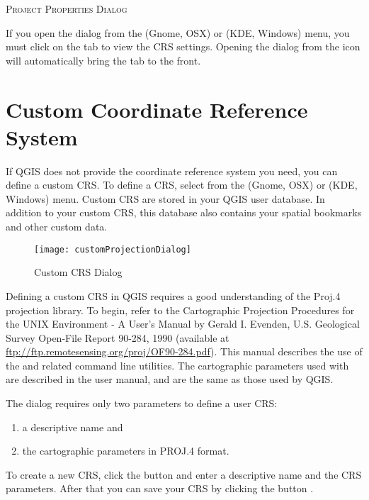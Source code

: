 \begin{Tip}
\caption{\textsc{Project Properties Dialog}}
If you open the  dialog from the
 (Gnome, OSX) or  
(KDE, Windows) menu, you must click on the  tab to view the CRS settings. Opening the dialog from the
 icon will automatically bring
the  tab to the front.
\end{Tip}

\section{Custom Coordinate Reference System}\label{sec:customprojections}

If QGIS does not provide the coordinate reference system you need, you
can define a custom CRS. To define a CRS, select
 from the  
(Gnome, OSX) or  (KDE, Windows) menu.
Custom CRS are stored in your QGIS user database. In addition to your custom
CRS, this database also contains your spatial bookmarks and other custom data. 

\begin{figure}[ht]
   \centering
   \caption{Custom CRS Dialog \nixcaption}\label{fig:customprojections}\smallskip
   \texttt{[image: customProjectionDialog]}
\end{figure}

Defining a custom CRS in QGIS requires a good understanding of the Proj.4
projection library. To begin, refer to the Cartographic Projection Procedures
for the UNIX Environment - A User's Manual by Gerald I. Evenden, U.S.
Geological Survey Open-File Report 90-284, 1990 (available at \url{ftp://ftp.remotesensing.org/proj/OF90-284.pdf}).
This manual describes the use of the  and related command line
utilities. The cartographic parameters used with  are
described in the user manual, and are the same as those used by QGIS. 

The  dialog requires
only two parameters to define a user CRS: 
\begin{enumerate}
\item a descriptive name and
\item the cartographic parameters in PROJ.4 format.
\end{enumerate}
To create a new CRS, click the  button and enter a
descriptive name and the CRS parameters. After that you can save your CRS by
clicking the button .

